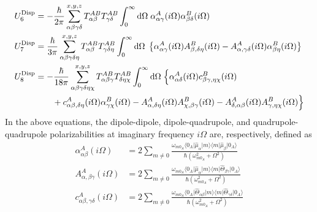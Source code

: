 \documentclass[a4paper,titlepage,twoside,fleqn,12pt]{book}
\begin{document}
\begin{refsection}
\begin{subequations}
\begin{align}
  U^{\rm Disp}_6 &= - \frac{\hbar}{2\pi} \sum_{\alpha\beta\gamma\delta}^{x,y,z}
   T^{AB}_{\alpha\beta}T^{AB}_{\gamma\delta} \int_0^{\infty} {\rm d}\Omega \; 
    \alpha^A_{\alpha\gamma}(i\Omega)\alpha^B_{\beta\delta}(i\Omega) \label{e:edisp6}\\
  U^{\rm Disp}_7 &= \frac{\hbar}{3\pi} \sum_{\alpha\beta\gamma\delta\eta}^{x,y,z}
   T^{AB}_{\alpha\beta}T^{AB}_{\gamma\delta\eta} \int_0^{\infty} {\rm d}\Omega \; 
    \left\{ 
     \alpha^A_{\alpha\gamma}(i\Omega)A^B_{\beta,\delta\eta}(i\Omega) -
     A^A_{\alpha,\gamma\delta}(i\Omega)\alpha^B_{\beta\eta}(i\Omega) 
    \right\} \\
   U^{\rm Disp}_8 &= - \frac{\hbar}{18\pi} \sum_{\alpha\beta\gamma\delta\eta\chi}^{x,y,z}
   T^{AB}_{\alpha\beta\gamma}T^{AB}_{\delta\eta\chi} \int_0^{\infty} {\rm d}\Omega \; 
    \Big\{ 
      \alpha^A_{\alpha\delta}(i\Omega) c^B_{\beta\gamma,\eta\chi}(i\Omega) \nonumber \\  &\qquad+ 
      c^A_{\alpha\beta,\delta\eta}(i\Omega) \alpha^B_{\gamma\chi}(i\Omega) -
      A^A_{\alpha,\delta\eta}(i\Omega) A^B_{\chi,\beta\gamma}(i\Omega) -
      A^A_{\delta,\alpha\beta}(i\Omega) A^B_{\gamma,\eta\chi}(i\Omega)
   \Big\}
 \end{align}
\end{subequations}
%
In the above equations, the dipole\hyp{}dipole, dipole\hyp{}quadrupole, 
and quadrupole\hyp{}quadrupole polarizabilities at imaginary frequency 
$i\Omega$ are, respectively, defined as
%
\begin{subequations} \label{e:iomega-polarizabilities}
 \begin{align}
  \alpha^A_{\alpha\beta}(i\Omega) &= 2\sum_{m\neq 0} \frac{
\omega_{m0_A} 
\langle 0_A \lvert \hat{\mu}_{\alpha} \rvert m \rangle  \langle m \lvert \hat{\mu}_{\beta} \rvert 0_A \rangle 
}{\hbar \left( \omega_{m0_A}^2 + \Omega^2 \right)} \\
%
  A^A_{\alpha,\beta\gamma}(i\Omega) &= 2\sum_{m\neq 0} \frac{
\omega_{m0_A} 
\langle 0_A \lvert \hat{\mu}_{\alpha} \rvert m \rangle  \langle m \lvert \hat{\Theta}_{\beta\gamma} \rvert 0_A \rangle 
}{\hbar \left( \omega_{m0_A}^2 + \Omega^2 \right)} \\
%
  c^A_{\alpha\beta,\gamma\delta}(i\Omega) &= 2\sum_{m\neq 0} \frac{
\omega_{m0_A} 
\langle 0_A \lvert \hat{\Theta}_{\alpha\beta} \rvert m \rangle  \langle m \lvert \hat{\Theta}_{\gamma\delta} \rvert 0_A \rangle 
}{\hbar \left( \omega_{m0_A}^2 + \Omega^2 \right)}
 \end{align}
\end{subequations}

\end{refsection}
\end{document}
